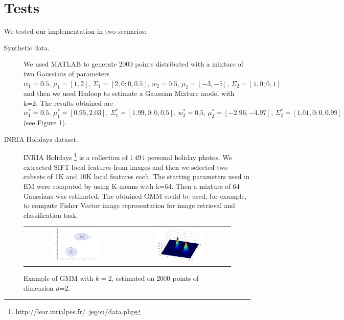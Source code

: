 \documentclass[a4paper,10pt]{article}
\begin{document}
\section{Tests}
We tested our implementation in two scenarios:
\begin{description}
	\item[Synthetic data.] We used MATLAB to generate 2000 points distributed with a mixture of two Gaussians of parameters $w_1=0.5,\, \mu_1=[1 , 2],\ \Sigma_1=[2, 0; 0, 0.5], \, w_2=0.5, \, \mu_2=[-3, -5], \,\Sigma_2=[1, 0; 0, 1]$ and then we used Hadoop to estimate a Gaussian Mixture model with k=2. The results obtained are $w_1^*=0.5,\, \mu_1^*=[0.95 , 2.03],\ \Sigma_1^*=[1.99, 0; 0, 0.5], \, w_2^*=0.5, \, \mu_2^*=[-2.96,  -4.97], \,\Sigma_2^*=[1.01, 0; 0, 0.99]$ (see  Figure \ref{fig:gmmd2k2}). 
	\item[INRIA Holidays dataset.] INRIA Holidays \footnote{http://lear.inrialpes.fr/~jegou/data.php}
	is a collection of $1\,491$ personal holiday photos. We extracted SIFT local features from images and then we selected two subsets of 1K and 10K local features each. The starting parameters used in EM were computed by using K-means with k=64. Then a mixture of 64 Gaussians was estimated. The obtained GMM could be used, for example, to compute Fisher Vector \cite{sanchez13} image representation for image retrieval and classification task.
	
\end{description}

 
\begin{figure}[htb]
	\smallskip
	\centering
	\begin{tabular}{cc}
		\includegraphics[width=0.50\textwidth]{ourGmmK2.png} &
		\includegraphics[width=0.50\textwidth]{ourGmmK2-ezsurf.png} \\
	\end{tabular}
	\caption{\label{fig:gmmd2k2}
		Example of GMM with $k=2$, estimated on 2000 points of dimension $d$=2.  }
\end{figure}









\end{document}
